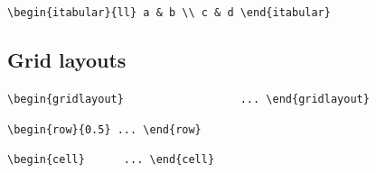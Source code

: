 \documentclass[11pt, a4paper]{article}
\begin{document}
\hfill
\lstinline[style=custom-latex]|\begin{itabular}{ll} a & b \\ c & d \end{itabular}|



\subsection*{Grid layouts}
\hfill
\lstinline[style=custom-latex]|\begin{gridlayout}{\textwidth}{8cm} ... \end{gridlayout}|

\hfill
\lstinline[style=custom-latex]|\begin{row}{0.5} ... \end{row}|

\hfill
\lstinline[style=custom-latex]|\begin{cell}{0.5} ... \end{cell}|



\end{document}
